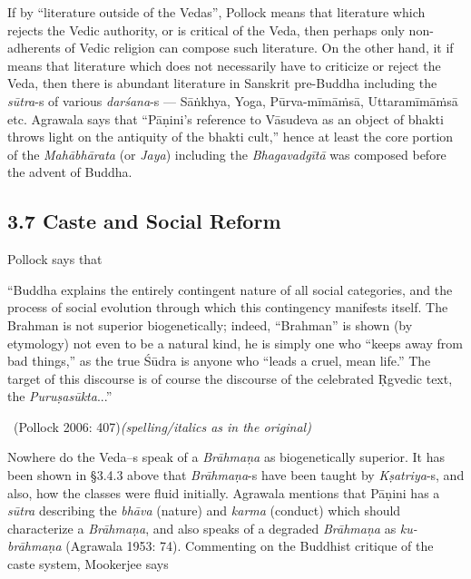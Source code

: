 If by “literature outside of the Vedas”, Pollock means that literature which rejects the Vedic authority, or is critical of the Veda, then perhaps only non-adherents of Vedic religion can compose such literature. On the other hand, it if means that literature which does not necessarily have to criticize or reject the Veda, then there is abundant literature in Sanskrit pre-Buddha including the \textit{sūtra}-s of various \textit{darśana}-s — {Sāṅkhya}, {Yoga}, {Pūrva-mīmāṁsā}, {Uttaramīmāṁsā} etc. Agrawala says that “Pāṇini’s reference to Vāsudeva as an object of bhakti throws light on the antiquity of the bhakti cult,” hence at least the core portion of the \textit{Mahābhārata} (or \textit{Jaya}) including the \textit{Bhagavadgītā} was composed before the advent of Buddha.


\subsection*{3.7 Caste and Social Reform}

Pollock says that

\begin{myquote}
“Buddha explains the entirely contingent nature of all social categories, and the process of social evolution through which this contingency manifests itself. The Brahman is not superior biogenetically; indeed, “Brahman” is shown (by etymology) not even to be a natural kind, he is simply one who “keeps away from bad things,” as the true Śūdra is anyone who “leads a cruel, mean life.” The target of this discourse is of course the discourse of the celebrated Ṛgvedic text, the \textit{Puruṣasūkta}...” 

~\hfill (Pollock 2006: 407)\textit{(spelling/italics as in the original)}
\end{myquote}

Nowhere do the Veda--s speak of a \textit{Brāhmaṇa} as biogenetically superior. It has been shown in §3.4.3 above that \textit{Brāhmaṇa}-s have been taught by \textit{Kṣatriya}-s, and also, how the classes were fluid initially. Agrawala mentions that Pāṇini has a \textit{sūtra} describing the \textit{bhāva} (nature) and \textit{karma} (conduct) which should characterize a \textit{Brāhmaṇa}, and also speaks of a degraded \textit{Brāhmaṇa} as \textit{ku-brāhmaṇa} (Agrawala 1953: 74). Commenting on the Buddhist critique of the caste system, Mookerjee says

